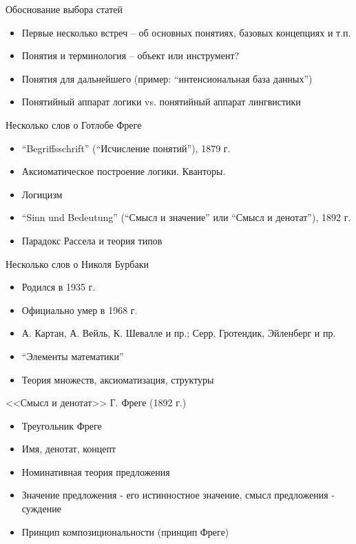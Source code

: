 \documentclass{beamer}
\begin{document}
\begin{frame}{Обоснование выбора статей}
    \begin{itemize}
        \item Первые несколько встреч -- об основных понятиях, базовых концепциях и т.п.
        \item Понятия и терминология -- объект или инструмент?
        \item Понятия для дальнейшего (пример: ``интенсиональная база данных'')
        \item Понятийный аппарат логики vs. понятийный аппарат лингвистики
    \end{itemize}
\end{frame}

\begin{frame}{Несколько слов о Готлобе Фреге}
    \begin{itemize}
        \item ``Begriffsschrift'' (``Исчисление понятий''), 1879 г.
        \item Аксиоматическое построение логики. Кванторы.
        \item Логицизм
        \item ``Sinn und Bedeutung'' (``Смысл и значение'' или ``Смысл и денотат''), 1892 г.
        \item Парадокс Рассела и теория типов
    \end{itemize}
\end{frame}

\begin{frame}{Несколько слов о Николя Бурбаки}
    \begin{itemize}
        \item Родился в 1935 г. 
        \item Официально умер в 1968 г. 
        \item А. Картан, А. Вейль, К. Шевалле и пр.; Серр, Гротендик, Эйленберг и пр. 
        \item ``Элементы математики''
        \item Теория множеств, аксиоматизация, структуры
    \end{itemize}
\end{frame}

\begin{frame}{<<Смысл и денотат>> Г. Фреге (1892 г.)}
    \begin{itemize}
        \item Треугольник Фреге
        \item Имя, денотат, концепт
        \item Номинативная теория предложения
        \item Значение предложения - его истинностное значение, смысл предложения - суждение
        \item Принцип композициональности (принцип Фреге)
    \end{itemize}
\end{frame}
\end{document}
